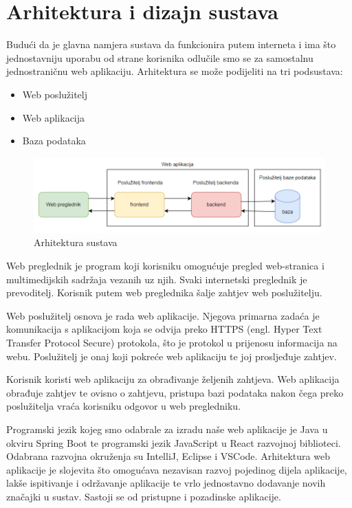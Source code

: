 \chapter{Arhitektura i dizajn sustava}
		
		
		Budući da je glavna namjera sustava da funkcionira putem interneta i ima što jednostavniju uporabu od strane korisnika odlučile smo se za samostalnu jednostraničnu web aplikaciju.
		Arhitektura se može podijeliti na tri podsustava:
		\begin{itemize}
		\item Web poslužitelj
		\item Web aplikacija
		\item Baza podataka
	 	\end{itemize}
 	
 		\begin{figure}[H]
 			\includegraphics[scale=0.8]{slike/Arhitektura.png} %
 			\centering
 			\caption{Arhitektura sustava}
 			\label{fig:arhitektura}
 		\end{figure}
		
		Web preglednik je program koji korisniku omogućuje pregled web-stranica i multimedijskih sadržaja vezanih uz njih. Svaki internetski preglednik je prevoditelj. Korisnik putem web preglednika šalje zahtjev web poslužitelju.
		
		Web poslužitelj osnova je rada web aplikacije. Njegova primarna zadaća je komunikacija s aplikacijom koja se odvija preko HTTPS (engl. Hyper Text Transfer Protocol Secure) protokola, što je protokol u prijenosu informacija na webu. Poslužitelj je onaj koji pokreće web aplikaciju te joj prosljeđuje zahtjev.
		
		Korisnik koristi web aplikaciju za obrađivanje željenih zahtjeva. Web aplikacija obrađuje zahtjev te ovisno o zahtjevu, pristupa bazi podataka nakon čega preko poslužitelja vraća korisniku odgovor u web pregledniku.
		
		Programski jezik kojeg smo odabrale za izradu naše web aplikacije je Java u okviru Spring Boot te programski jezik JavaScript u React razvojnoj biblioteci. Odabrana razvojna okruženja su IntelliJ, Eclipse i  VSCode.
		Arhitektura web aplikacije je slojevita što omogućava nezavisan razvoj pojedinog dijela aplikacije, lakše ispitivanje i održavanje aplikacije te vrlo jednostavno dodavanje novih značajki u sustav. Sastoji se od pristupne i pozadinske aplikacije.
		
